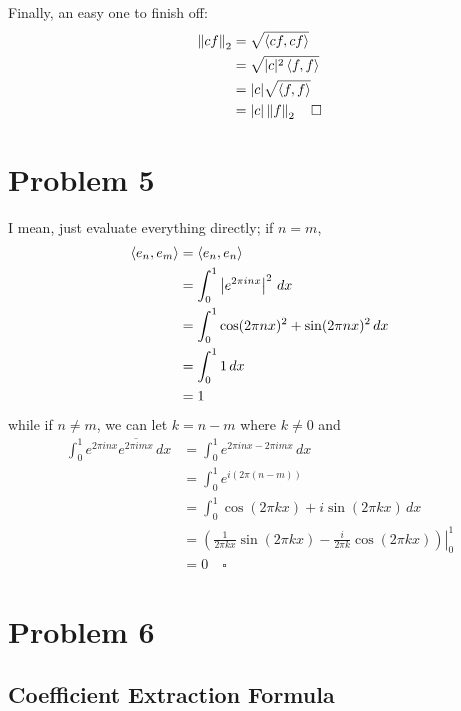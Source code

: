 \documentclass[12pt]{article}
\newcommand{\norm}[1]{\left\lVert#1\right\rVert}
\begin{document}
Finally, an easy one to finish off:
\begin{align*}
  \norm{cf}_2
   & = \sqrt{\braket{cf, cf}}    \\
   & = \sqrt{|c|^2\braket{f, f}} \\
   & = |c|\sqrt{\braket{f, f}}   \\
   & = |c|\norm{f}_2\quad\square
\end{align*}

\pagebreak

\section{Problem 5}\label{sec:p5}

I mean, just evaluate everything directly; if $n=m$,
\begin{align*}
  \Braket{e_n, e_m}
   & = \braket{e_n, e_n}                                \\
   & = \int_{0}^{1} \left|e^{2\pi inx}\right|^2\,dx     \\
   & = \int_{0}^{1} \cos(2\pi nx)^2+\sin(2\pi nx)^2\,dx \\
   & = \int_{0}^{1} 1\,dx                               \\
   & = 1
\end{align*}
while if $n \ne m$, we can let $k=n-m$ where $k \ne 0$ and
\begin{align*}
  \int_{0}^{1} e^{2\pi inx}\overline{e^{2\pi imx}}\,dx
   & = \int_{0}^{1} e^{2\pi inx-2\pi imx}\,dx                                                       \\
   & = \int_{0}^{1} e^{i(2\pi(n-m))}                                                                \\
   & = \int_{0}^{1} \cos(2\pi kx)+i\sin(2\pi kx)\,dx                                                \\
   & = \left.\left(\frac{1}{2\pi kx}\sin(2\pi kx) - \frac{i}{2\pi k}\cos(2\pi kx)\right)\right|^1_0 \\
   & = 0\quad\square
\end{align*}

\pagebreak

\section{Problem 6}

\subsection{Coefficient Extraction Formula}
\end{document}
